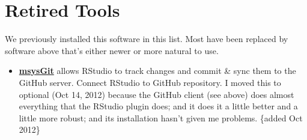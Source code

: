 \documentclass[]{book}
\begin{document}
\hypertarget{retired-tools}{%
\section{Retired Tools}\label{retired-tools}}

We previously installed this software in this list. Most have been replaced by software above that's either newer or more natural to use.

\begin{itemize}
\item
  \textbf{\href{http://msysgit.github.com/}{msysGit}} allows RStudio to track changes and commit \& sync them to the GitHub server. Connect RStudio to GitHub repository. I moved this to optional (Oct 14, 2012) because the GitHub client (see above) does almost everything that the RStudio plugin does; and it does it a little better and a little more robust; and its installation hasn't given me problems. \{added Oct 2012\}


\end{itemize}
\end{document}
